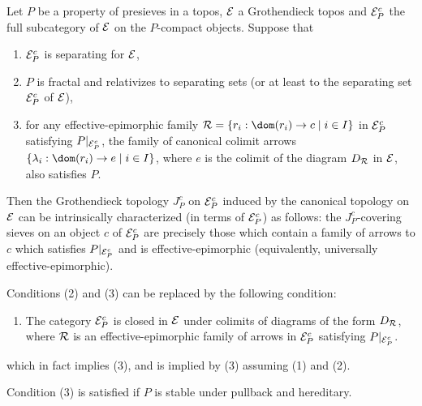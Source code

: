 \documentclass[a4paper,12pt]{article}
\begin{document}
\begin{proposition}
	Let $P$ be a property of presieves in a topos, $\cal E$ a Grothendieck topos and ${\cal E}^{c}_{P}$ the full subcategory of $\cal E$ on the $P$-compact objects. Suppose that 
	\begin{enumerate}[(1)]
		\item  ${\cal E}^{c}_{P}$ is separating for $\cal E$,
		\item  $P$ is fractal and relativizes to separating sets (or at least to the separating set ${\cal E}^{c}_{P}$ of $\cal E$),
		\item for any effective-epimorphic family ${\cal R}=\{r_i:\dom(r_i) \to c \mid i\in I\}$ in ${\cal E}^{c}_{P}$ satisfying $P|_{{\cal E}^{c}_{P}}$, the family of canonical colimit arrows $\{\lambda_i:\dom(r_i) \to e \mid i\in I\}$, where $e$ is the colimit of the diagram $D_{{\cal R}}$ in $\cal E$, also satisfies $P$.
	\end{enumerate} Then the Grothendieck topology $J^{c}_{P}$ on ${\cal E}^{c}_{P}$ induced by the canonical topology on $\cal E$ can be intrinsically characterized (in terms of ${\cal E}^{c}_{P}$) as follows: the $J^{c}_{P}$-covering sieves on an object $c$ of ${\cal E}^{c}_{P}$ are precisely those which contain a family of arrows to $c$ which satisfies $P|_{{\cal E}^{c}_{P}}$ and is effective-epimorphic (equivalently, universally effective-epimorphic). 
	
	Conditions (2) and (3) can be replaced by the following condition: 
	\begin{enumerate}
		\item[(4)] The category ${\cal E}^{c}_{P}$ is closed in $\cal E$ under colimits of diagrams of the form $D_{\cal R}$, where $\cal R$ is an effective-epimorphic family of arrows in ${\cal E}^{c}_{P}$ satisfying $P|_{{\cal E}^{c}_{P}}$.
	\end{enumerate} 
	which in fact implies (3), and is implied by (3) assuming (1) and (2).
	
	Condition (3) is satisfied if $P$ is stable under pullback and hereditary. 
\end{proposition} 
\end{document}
